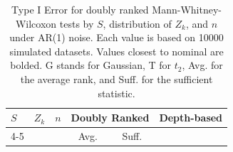 \documentclass[12pt]{article}
\theoremstyle{plain}
\theoremstyle{remark}
\begin{document}
\begin{table}
	\centering
	\caption{Type I Error for doubly ranked Mann-Whitney-Wilcoxon tests by $S$, distribution of $Z_k$, and $n$ under AR(1) noise. Each value is based on 10000 simulated datasets. Values closest to nominal are bolded. G stands for Gaussian, T for $t_2$, Avg. for the average rank, and Suff. for the sufficient statistic. \label{t:mwwe}}
	\begin{tabular}{lllccc}
		  \hline
		  \multirow{2}{*}{$S$} & \multirow{2}{*}{$Z_k$} & \multirow{2}{*}{$n$} &  \multicolumn{2}{c}{Doubly Ranked} & \multirow{2}{*}{Depth-based}  \\
		 \cline{4-5}
		  &  &  & Avg. & Suff. & \\ 
		  \hline

\end{tabular}
\end{table}
\end{document}
